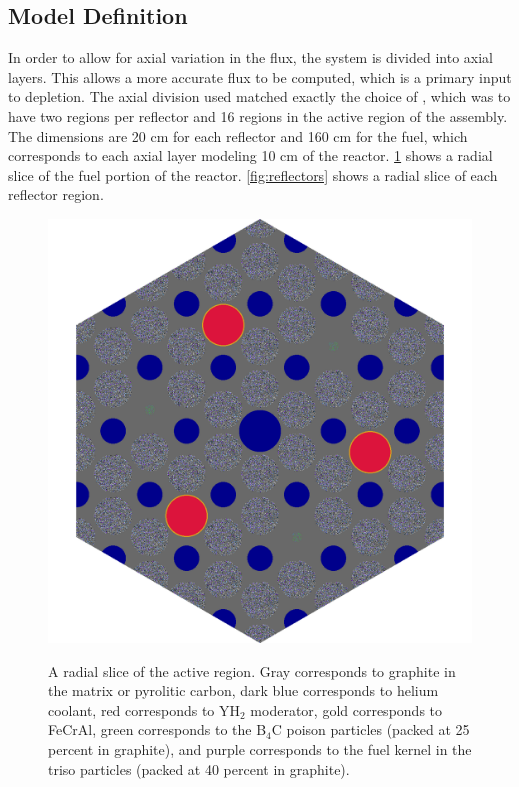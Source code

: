 \documentclass[letterpaper]{physor2024}
\begin{document}
\subsection{Model Definition}\label{sec:model_def}
In order to allow for axial variation in the flux, the system is divided into axial layers. This allows a more accurate flux to be computed, which is a primary input to depletion. The axial division used matched exactly the choice of \cite{Abdelhameed-ANS-2022}, which was to have two regions per reflector and 16 regions in the active region of the assembly. The dimensions are 20 cm for each reflector and 160 cm for the fuel, which corresponds to each axial layer modeling 10 cm of the reactor. \cref{fig:core_slice_sbs} shows a radial slice of the fuel portion of the reactor. \cref{fig:reflectors} shows a radial slice of each reflector region.
\begin{figure}[h!]
    \centering
    \includegraphics[width=0.7\linewidth]{figures/active_height.png}
    \label{fig:active_slice}
    \caption{A radial slice of the active region. Gray corresponds to graphite in the matrix or pyrolitic carbon, dark blue corresponds to helium coolant, red corresponds to YH$_{2}$ moderator, gold corresponds to FeCrAl, green corresponds to the B$_{4}$C poison particles (packed at 25 percent in graphite), and purple corresponds to the fuel kernel in the \gls{triso} particles (packed at 40 percent in graphite).}
    \label{fig:core_slice_sbs}
\end{figure}
\end{document}
